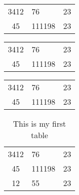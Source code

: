 \documentclass{book}
\begin{document}
\begin{tabular}{clr}
    3412 & 76 & 23\\
    45 & 111198 & 23\\
\end{tabular}

\begin{tabular}{c|l|r}
    3412 & 76 & 23\\
    45 & 111198 & 23\\
\end{tabular}

\begin{tabular}{c|l|r}
    \hline
    3412 & 76 & 23\\
    45 & 111198 & 23\\
    \hline
\end{tabular}





\begin{table}
    \centering

    \begin{tabular}{clr}
        \hline
        3412 & 76 & 23\\
        \cline{2-3}
        45 & 111198 & 23\\
        12 & 55 & 23\\
    \end{tabular}





    \caption{This is my first table}

\end{table}
\end{document}
